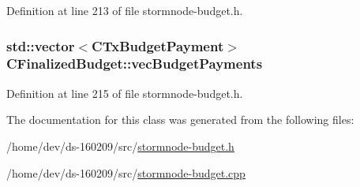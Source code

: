 Definition at line 213 of file stormnode-\/budget.\+h.

\hypertarget{class_c_finalized_budget_a639e7be9254d99deb42aeeb15de63174}{}
\subsubsection[{vec\+Budget\+Payments}]{\setlength{\rightskip}{0pt plus 5cm}std\+::vector$<${\bf C\+Tx\+Budget\+Payment}$>$ C\+Finalized\+Budget\+::vec\+Budget\+Payments}\label{class_c_finalized_budget_a639e7be9254d99deb42aeeb15de63174}


Definition at line 215 of file stormnode-\/budget.\+h.



The documentation for this class was generated from the following files\+:\begin{DoxyCompactItemize}
\item 
/home/dev/ds-\/160209/src/\hyperlink{stormnode-budget_8h}{stormnode-\/budget.\+h}\item 
/home/dev/ds-\/160209/src/\hyperlink{stormnode-budget_8cpp}{stormnode-\/budget.\+cpp}\end{DoxyCompactItemize}
